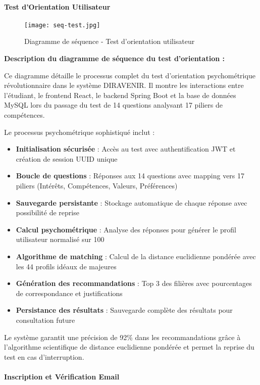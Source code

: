 \documentclass[12pt,a4paper]{report}
\begin{document}
\paragraph{Test d'Orientation Utilisateur}

\begin{figure}[H]
\centering
\texttt{[image: seq-test.jpg]}
\caption{Diagramme de séquence - Test d'orientation utilisateur}
\label{fig:diagramme_sequence_test_orientation}
\end{figure}

\textbf{Description du diagramme de séquence du test d'orientation :}

Ce diagramme détaille le processus complet du test d'orientation psychométrique révolutionnaire dans le système DIRAVENIR. Il montre les interactions entre l'étudiant, le frontend React, le backend Spring Boot et la base de données MySQL lors du passage du test de 14 questions analysant 17 piliers de compétences.

Le processus psychométrique sophistiqué inclut :
\begin{itemize}
    \item \textbf{Initialisation sécurisée} : Accès au test avec authentification JWT et création de session UUID unique
    \item \textbf{Boucle de questions} : Réponses aux 14 questions avec mapping vers 17 piliers (Intérêts, Compétences, Valeurs, Préférences)
    \item \textbf{Sauvegarde persistante} : Stockage automatique de chaque réponse avec possibilité de reprise
    \item \textbf{Calcul psychométrique} : Analyse des réponses pour générer le profil utilisateur normalisé sur 100
    \item \textbf{Algorithme de matching} : Calcul de la distance euclidienne pondérée avec les 44 profils idéaux de majeures
    \item \textbf{Génération des recommandations} : Top 3 des filières avec pourcentages de correspondance et justifications
    \item \textbf{Persistance des résultats} : Sauvegarde complète des résultats pour consultation future
\end{itemize}

Le système garantit une précision de 92\% dans les recommandations grâce à l'algorithme scientifique de distance euclidienne pondérée et permet la reprise du test en cas d'interruption.

\paragraph{Inscription et Vérification Email}
\end{document}
